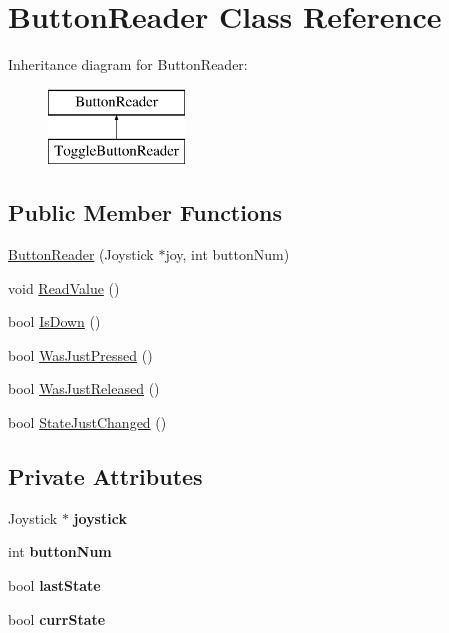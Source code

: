 \hypertarget{class_button_reader}{}\section{Button\+Reader Class Reference}
\label{class_button_reader}
Inheritance diagram for Button\+Reader\+:\begin{figure}[H]
\begin{center}
\leavevmode
\includegraphics[height=2.000000cm]{class_button_reader}
\end{center}
\end{figure}
\subsection*{Public Member Functions}
\begin{DoxyCompactItemize}
\item 
\hyperlink{class_button_reader_a1bb75f75d6e392a748c6101e09e3bd3c}{Button\+Reader} (Joystick $\ast$joy, int button\+Num)
\item 
void \hyperlink{class_button_reader_a4585d7ca717ea49021ac5a786c352b81}{Read\+Value} ()
\item 
bool \hyperlink{class_button_reader_a89a81fffd0726973811c6e791ac12a1d}{Is\+Down} ()
\item 
bool \hyperlink{class_button_reader_ace4a07bf7f65418c026477b9d5ab1225}{Was\+Just\+Pressed} ()
\item 
bool \hyperlink{class_button_reader_afded4de61711a165928fe0730d8743e7}{Was\+Just\+Released} ()
\item 
bool \hyperlink{class_button_reader_a2c19cae72a053bbba95f1c1a91735876}{State\+Just\+Changed} ()
\end{DoxyCompactItemize}
\subsection*{Private Attributes}
\begin{DoxyCompactItemize}
\item 
\mbox{\label{class_button_reader_aac4f8ee19043c203be56abf375e8b319}} 
Joystick $\ast$ {\bfseries joystick}
\item 
\mbox{\label{class_button_reader_a92bac462d8bc6ee16fea40c13ff50e95}} 
int {\bfseries button\+Num}
\item 
\mbox{\label{class_button_reader_a6fab0789d8dd7b5c424e7fa3c12d4ca9}} 
bool {\bfseries last\+State}
\item 
\mbox{\label{class_button_reader_a1d139e4dbe81f6b1942b5f74c56b6492}} 
bool {\bfseries curr\+State}
\end{DoxyCompactItemize}


